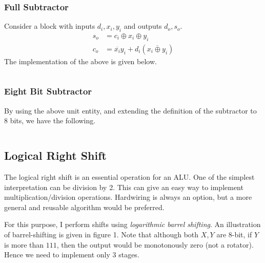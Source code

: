 \documentclass[a4paper, 11pt]{article}
\begin{document}
\subsubsection*{Full Subtractor}
Consider a block with inputs $d_i, x_i, y_i$ and outputs $d_o, s_o$.
\begin{equation}
\begin{split}
s_o &= c_i \oplus x_i \oplus y_i \\
c_o &= \overline{x_i}y_i + d_i(\overline{x_i \oplus y_i})
\end{split}
\end{equation}
The implementation of the above is given below.
\inputminted[linenos]{vhdl}{ALU_exp/subtractor.vhd}
\subsubsection*{Eight Bit Subtractor}
By using the above unit entity, and extending the definition of the subtractor to 8 bits, we have the following.
\inputminted[linenos]{vhdl}{ALU_exp/EightBitSubtractor.vhd}


\subsection{Logical Right Shift}
The logical right shift is an essential operation for an ALU. One of the simplest interpretation can be division by 2. This can give an easy way to implement multiplication/division operations. Hardwiring is always an option, but a more general and reusable algorithm would be preferred.

For this purpose, I perform shifts using \emph{logarithmic barrel shifting}. An illustration of barrel-shifting is given in figure 1. Note that although both $X, Y$ are 8-bit, if $Y$ is more than $111$, then the output would be monotonously zero (not a rotator). Hence we need to implement only 3 stages.
\end{document}
